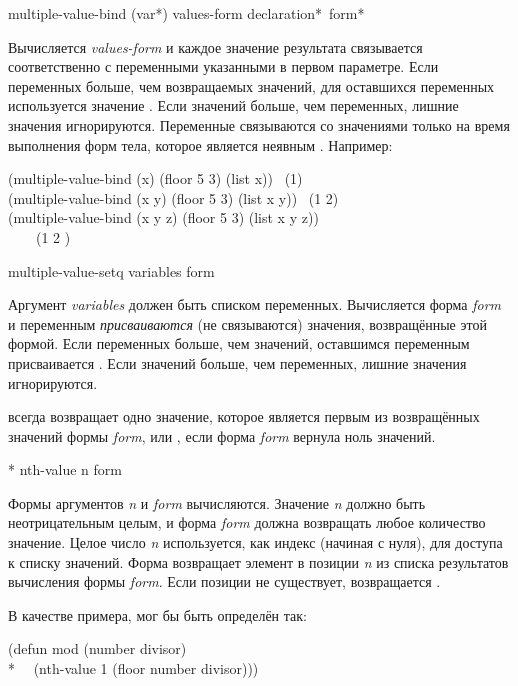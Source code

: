 \begin{defmac}
multiple-value-bind ({var}*) values-form
                    {declaration}* {\,form}*

Вычисляется \emph{values-form} и каждое значение результата связывается
соответственно с переменными указанными в первом параметре.
Если переменных больше, чем возвращаемых значений, для оставшихся переменных
используется значение {\false}. Если значений больше, чем переменных, лишние
значения игнорируются. Переменные связываются со значениями только на время
выполнения форм тела, которое является неявным .
Например:
\begin{lisp}
(multiple-value-bind (x) (floor 5 3) (list x)) \EV\ (1) \\
(multiple-value-bind (x y) (floor 5 3) (list x y)) \EV\ (1 2) \\
(multiple-value-bind (x y z) (floor 5 3) (list x y z)) \\
~~~\EV\ (1 2 {\false})
\end{lisp}
\end{defmac}

\begin{defmac}
multiple-value-setq variables form

Аргумент \emph{variables} должен быть списком переменных. Вычисляется форма
\emph{form} и переменным \emph{присваиваются} (не связываются) значения,
возвращённые этой формой. Если переменных больше, чем значений, оставшимся
переменным присваивается {\false}. Если значений больше, чем переменных, лишние
значения игнорируются.

 всегда возвращает одно значение, которое является
первым из возвращённых значений формы \emph{form}, или {\false}, если форма
\emph{form} вернула ноль значений.
\end{defmac}

\begin{defmac}*
nth-value n form

Формы аргументов \emph{n} и \emph{form} вычисляются.
Значение \emph{n} должно быть неотрицательным целым, и форма \emph{form} должна
возвращать любое количество значение.
Целое число \emph{n} используется, как индекс (начиная с нуля), для доступа к
списку значений.
Форма возвращает элемент в позиции \emph{n} из списка результатов вычисления
формы \emph{form}. Если позиции не существует, возвращается .

В качестве примера,  мог бы быть определён так:
\begin{lisp}
(defun mod (number divisor) \\*
~~(nth-value 1 (floor number divisor)))
\end{lisp}
\end{defmac}

